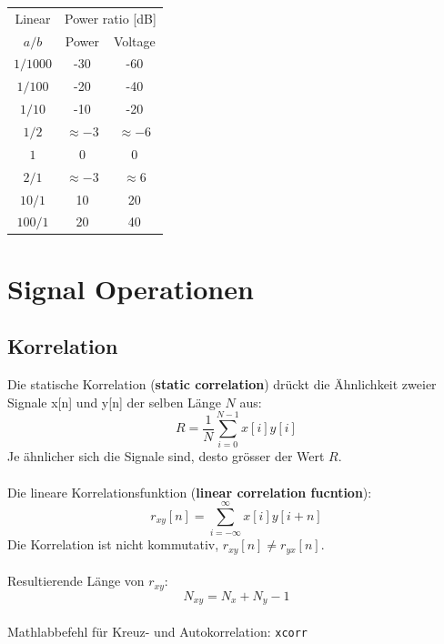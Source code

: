 \begin{table}[ht]
  \centering
  \begin{tabular}{ccc} \toprule
  Linear	& \multicolumn{2}{c}{Power ratio [dB]} \\ 
  $a/b$		& Power		& Voltage	\\ \midrule
  $1/1000$	& -30		& -60		\\
  $1/100$	& -20		& -40		\\
  $1/10$	& -10		& -20		\\
  $1/2$		& $\approx -3$& $\approx -6$\\
  $1$		& 0			& 0			\\
  $2/1$		& $\approx -3$& $\approx 6$\\
  $10/1$	& 10		& 20		\\
  $100/1$	& 20		& 40		\\  \bottomrule
  \end{tabular}
\end{table}

\section{Signal Operationen}
\subsection{Korrelation}
Die statische Korrelation (\textbf{static correlation}) drückt die Ähnlichkeit
zweier Signale x[n] und y[n] der selben Länge $N$ aus:
\[ R = \frac{1}{N} \sum_{i=0}^{N-1} x[i]y[i] \]
Je ähnlicher sich die Signale sind, desto grösser der Wert $R$.\\\\
Die lineare Korrelationsfunktion (\textbf{linear correlation fucntion}):
\[ r_{xy}[n] = \sum_{i=-\infty}^{\infty} x[i]y[i+n] \]
Die Korrelation ist nicht kommutativ, $r_{xy}[n] \neq r_{yx}[n]$.\\\\
Resultierende Länge von $r_{xy}$:
\[ N_{xy} = N_x + N_y - 1 \]
~\\
Mathlabbefehl für Kreuz- und Autokorrelation: \verb|xcorr|

